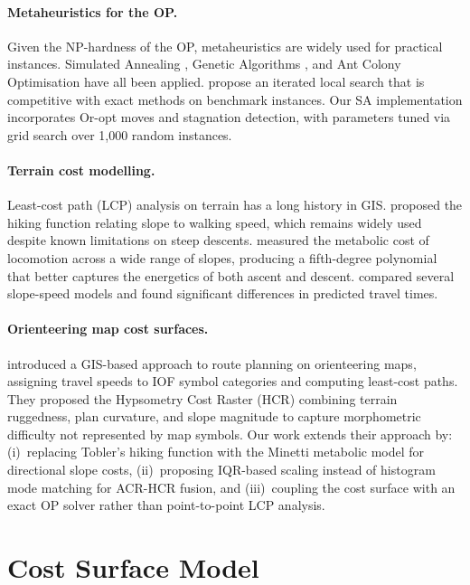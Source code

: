 \documentclass[11pt,a4paper]{article}
\begin{document}
\paragraph{Metaheuristics for the OP.}
Given the NP-hardness of the OP, metaheuristics are widely used for practical instances.
Simulated Annealing \citep{kirkpatrick1983sa}, Genetic Algorithms \citep{tasgetiren2002ga_op}, and Ant Colony Optimisation \citep{ke2008aco_op} have all been applied.
\citet{vansteenwegen2009iterated} propose an iterated local search that is competitive with exact methods on benchmark instances.
Our SA implementation incorporates Or-opt moves and stagnation detection, with parameters tuned via grid search over 1{,}000 random instances.

\paragraph{Terrain cost modelling.}
Least-cost path (LCP) analysis on terrain has a long history in GIS.
\citet{tobler1993} proposed the hiking function relating slope to walking speed, which remains widely used despite known limitations on steep descents.
\citet{minetti2002} measured the metabolic cost of locomotion across a wide range of slopes, producing a fifth-degree polynomial that better captures the energetics of both ascent and descent.
\citet{rees2004} compared several slope-speed models and found significant differences in predicted travel times.

\paragraph{Orienteering map cost surfaces.}
\citet{ica2021lcp} introduced a GIS-based approach to route planning on orienteering maps, assigning travel speeds to IOF symbol categories and computing least-cost paths.
They proposed the Hypsometry Cost Raster (HCR) combining terrain ruggedness, plan curvature, and slope magnitude to capture morphometric difficulty not represented by map symbols.
Our work extends their approach by: (i)~replacing Tobler's hiking function with the Minetti metabolic model for directional slope costs, (ii)~proposing IQR-based scaling instead of histogram mode matching for ACR-HCR fusion, and (iii)~coupling the cost surface with an exact OP solver rather than point-to-point LCP analysis.

\section{Cost Surface Model}
\label{sec:cost}
\end{document}
